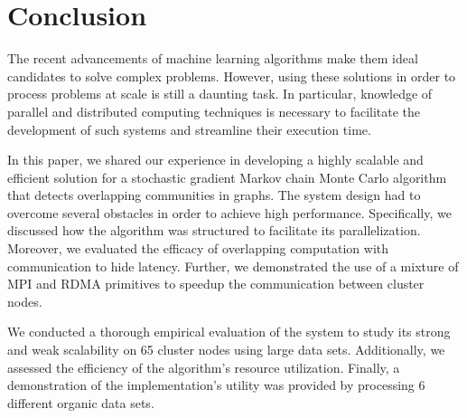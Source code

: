 \section{Conclusion}

The recent advancements of machine learning algorithms make them ideal
candidates to solve complex problems. However, using these solutions in order
to process problems at scale is still a daunting task. In particular, knowledge
of parallel and distributed computing techniques is necessary to facilitate the
development of such systems and streamline their execution time.

In this paper, we shared our experience in developing a highly scalable and
efficient solution for a stochastic gradient Markov chain Monte Carlo algorithm
that detects overlapping communities in graphs. The system design had to
overcome several obstacles in order to achieve high performance. Specifically,
we discussed how the algorithm was structured to facilitate its
parallelization. Moreover, we evaluated the efficacy of overlapping computation
with communication to hide latency.  Further, we demonstrated the use of a
mixture of MPI and RDMA primitives to speedup the communication between cluster
nodes.

We conducted a thorough empirical evaluation of the system to study its strong
and weak scalability on 65 cluster nodes using large data sets.  Additionally,
we assessed the efficiency of the algorithm's resource utilization. Finally, a
demonstration of the implementation's utility was provided by processing 6
different organic data sets.
